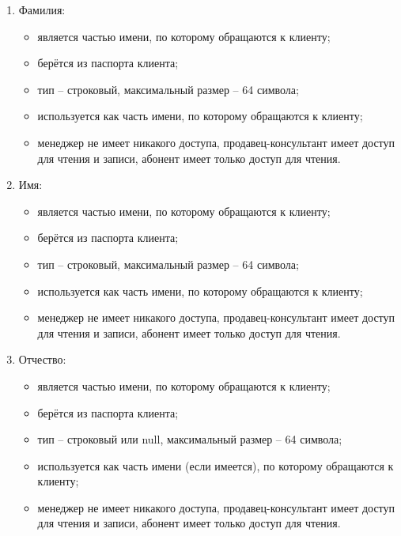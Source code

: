 \begin{enumerate}
\begin{enumerate}
        \item Фамилия:
        \begin{itemize}
            \item является частью имени, по которому обращаются к клиенту;
            \item берётся из паспорта клиента;
            \item тип -- строковый, максимальный размер -- 64 символа;
            \item используется как часть имени, по которому обращаются к клиенту;
            \item менеджер не имеет никакого доступа, продавец-консультант имеет доступ для чтения и записи, абонент имеет только доступ для чтения.
        \end{itemize}

        \item Имя:
        \begin{itemize}
            \item является частью имени, по которому обращаются к клиенту;
            \item берётся из паспорта клиента;
            \item тип -- строковый, максимальный размер -- 64 символа;
            \item используется как часть имени, по которому обращаются к клиенту;
            \item менеджер не имеет никакого доступа, продавец-консультант имеет доступ для чтения и записи, абонент имеет только доступ для чтения.
        \end{itemize}

        \item Отчество:
        \begin{itemize}
            \item является частью имени, по которому обращаются к клиенту;
            \item берётся из паспорта клиента;
            \item тип -- строковый или null, максимальный размер -- 64 символа;
            \item используется как часть имени (если имеется), по которому обращаются к клиенту;
            \item менеджер не имеет никакого доступа, продавец-консультант имеет доступ для чтения и записи, абонент имеет только доступ для чтения.
        \end{itemize}


\end{enumerate}
\end{enumerate}
